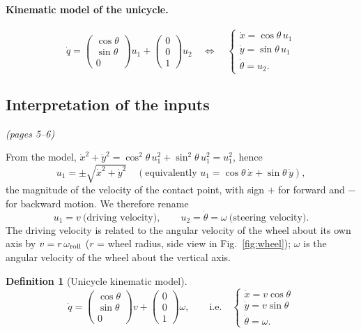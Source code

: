 \documentclass[11pt,a4paper]{article}
\newcommand{\dq}{\dot q}
\theoremstyle{definition}
\newtheorem{definition}{Definition}[section]
\theoremstyle{plain}
\theoremstyle{remark}
\begin{document}
\paragraph{Kinematic model of the unicycle.}
\[
\dq=\begin{pmatrix}\cos\theta\\ \sin\theta\\ 0\end{pmatrix}u_1+\begin{pmatrix}0\\0\\1\end{pmatrix}u_2
\quad\Longleftrightarrow\quad
\begin{cases}\dot x=\cos\theta\,u_1\\ \dot y=\sin\theta\,u_1\\ \dot\theta=u_2 .\end{cases}
\]

\subsection{Interpretation of the inputs}\emph{(pages 5--6)}

From the model, $\dot x^2+\dot y^2=\cos^2\theta\,u_1^2+\sin^2\theta\,u_1^2=u_1^2$, hence
\[
u_1=\pm\sqrt{\dot x^2+\dot y^2}\quad(\text{equivalently }u_1=\cos\theta\,\dot x+\sin\theta\,\dot y),
\]
the magnitude of the velocity of the contact point, with sign $+$ for forward and $-$ for backward motion. We therefore rename
\[
u_1=v\ \text{(driving velocity)},\qquad u_2=\dot\theta=\omega\ \text{(steering velocity)} .
\]
The driving velocity is related to the angular velocity of the wheel about its own axis by $v=r\,\omega_{\rm roll}$ ($r$ = wheel radius, side view in Fig.~\ref{fig:wheel}); $\omega$ is the angular velocity of the wheel about the vertical axis.

\begin{definition}[Unicycle kinematic model]
\[
\dq=\begin{pmatrix}\cos\theta\\ \sin\theta\\ 0\end{pmatrix}v+\begin{pmatrix}0\\0\\1\end{pmatrix}\omega,
\qquad\text{i.e.}\quad
\begin{cases}\dot x=v\cos\theta\\ \dot y=v\sin\theta\\ \dot\theta=\omega .\end{cases}
\]
\end{definition}
\end{document}
